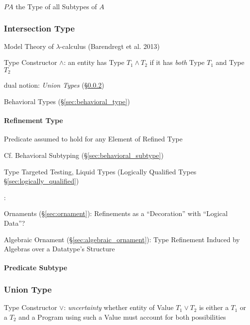 $P A$ the Type of all Subtypes of $A$



\subsubsection{Intersection Type}\label{sec:intersection_type}

Model Theory of $\lambda$-calculus (Barendregt et al. 2013)

Type Constructor $\wedge$: an entity has Type $T_1 \wedge T_2$ if it
has \emph{both} Type $T_1$ and Type $T_2$


dual notion: \emph{Union Types} (\S\ref{sec:union_type})

\fist Behavioral Types (\S\ref{sec:behavioral_type})



\paragraph{Refinement Type}\label{sec:refinement_type}\hfill

Predicate assumed to hold for any Element of Refined Type

\fist Cf. Behavioral Subtyping (\S\ref{sec:behavioral_subtype})

Type Targeted Testing, Liquid Types (Logically Qualified Types
\S\ref{sec:logically_qualified})


\asterism


\cite{mcbride13}:

Ornaments (\S\ref{sec:ornament}): Refinements as a ``Decoration'' with
``Logical Data''? %

Algebraic Ornament (\S\ref{sec:algebraic_ornament}): Type Refinement
Induced by Algebras over a Datatype's Structure



\paragraph{Predicate Subtype}\label{sec:predicate_subtype}\hfill



\subsubsection{Union Type}\label{sec:union_type}

Type Constructor $\vee$: \emph{uncertainty} whether entity of Value
$T_1 \vee T_2$ is either a $T_1$ or a $T_2$ and a Program using such a
Value must account for both possibilities

